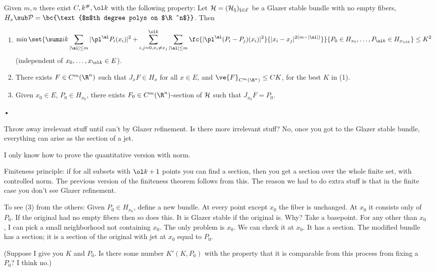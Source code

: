 \begin{lem}
Given $m,n$ there exist $C,k^\#, \ol k$ with the following property: Let $\cal H=(H_x)_{x\in E}$ be a Glazer stable bundle with no empty fibers, $H_x\sub \cal P=\bc{\text{$m$th degree polys on $\R^n$}}$. Then 
\begin{enumerate}
\item
\begin{align}
\min \set{
\sumz ik \sum_{|\al|\le m}
|\pl^\al P_i(x_i)|^2 + 
\sum_{i,j=0,x_i\ne x_j}^{\ol k}  \sum_{|\al|\le m}
\fc{|\pl^\al(P_i-P_j)(x_i)|^2}{|x_i-x_j|^{2(m-|\al|)}}
}{
P_0\in H_{x_0},\ldots, P_{\ol k}\in H_{x_{\ol k}}
}
&\le K^2
\end{align}
(independent of $x_0,\ldots, x_{\ol k}\in E$).
\item
%
There exists $F\in C^m(\R^n)$ such that $J_xF\in H_x$ for all $x\in E$, and $\ve{F}_{C^m(\R^n)} \le CK$, for the best $K$ in (1).
\item
Given $x_0\in E$, $P_0\in H_{x_0}$, there exists $F_0\in C^m(\R^n)$-section of $\cal H$ such that $J_{x_0}F=P_0$. 
\end{enumerate}•
\end{lem}

Throw away irrelevant stuff until can't by Glazer refinement. Is there more irrelevant stuff? No, once you got to the Glazer stable bundle, everything can arise as the section of a jet.

I only know how to prove the quantitative version with norm.

Finiteness principle: if for all subsets with $\ol k+1$ points you can find a section, then you get a section over the whole finite set, with controlled norm. The previous version of the finiteness theorem follows from this. The reason we had to do extra stuff is that in the finite case you don't see Glazer refinement. 

To see (3) from the others: Given $P_{0}\in H_{x_0}$, define a new bundle. At every point except $x_0$ the fiber is unchanged. At $x_0$ it consists only of $P_0$. If the original had no empty fibers then so does this. It is Glazer stable if the original is. Why? Take a basepoint. For any other than $x_0$, I can pick a small neighborhood not containing $x_0$. The only problem is $x_0$. We can check it at $x_0$. 
It has a section. The modified bundle has a section; it is a section of the original with jet at $x_0$ equal to $P_0$.

(Suppose I give you $K$ and $P_0$. Is there some number $K'(K,P_0)$ with the property that it is comparable from this process from fixing a $P_0$? I think no.)

